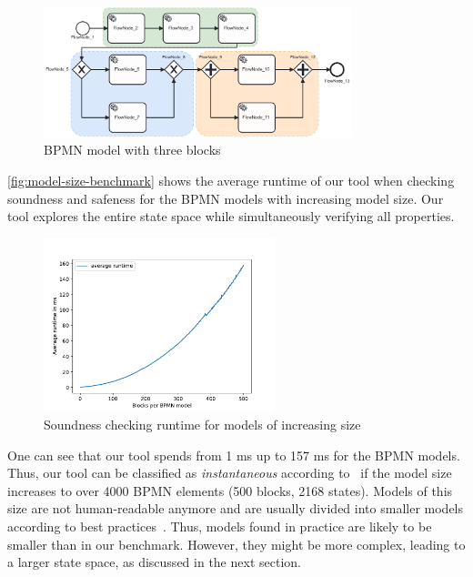 \documentclass[runningheads]{llncs}
\begin{document}
\begin{figure}[ht]
	\centering
	\includegraphics[width=0.8\textwidth]{images/three-blocks}
	\caption{BPMN model with three blocks~\cite{krauterHigherorderTransformationApproach2023}}
	\label{fig:three-block-example}
\end{figure}

\autoref{fig:model-size-benchmark} shows the average runtime of our tool when checking soundness and safeness for the BPMN models with increasing model size.
Our tool explores the entire state space while simultaneously verifying all properties.

\begin{figure}[ht]
	\centering
	\includegraphics[width=0.6\textwidth]{images/model-size-benchmark}
	\caption{Soundness checking runtime for models of increasing size}
	\label{fig:model-size-benchmark}
\end{figure}

One can see that our tool spends from 1 ms up to 157 ms for the BPMN models.
Thus, our tool can be classified as \textit{instantaneous} according to~\cite{fahlandAnalysisDemandInstantaneous2011} if the model size increases to over 4000 BPMN elements (500 blocks, 2168 states).
Models of this size are not human-readable anymore and are usually divided into smaller models according to best practices~\cite{fahlandAnalysisDemandInstantaneous2011}.
Thus, models found in practice are likely to be smaller than in our benchmark.
However, they might be more complex, leading to a larger state space, as discussed in the next section.
\end{document}
